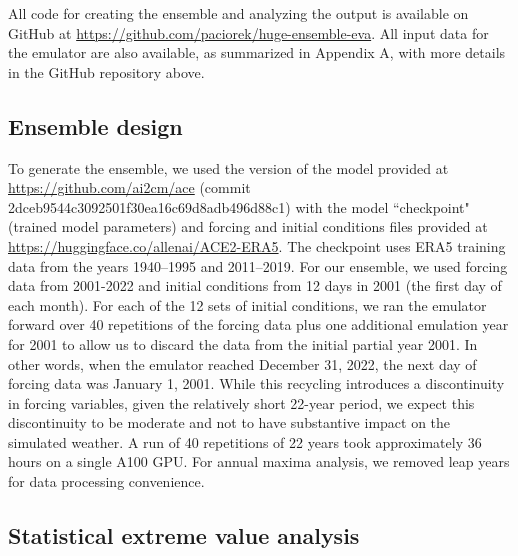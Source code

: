 \documentclass{ametsocV6.1}
\begin{document}
\datastatement
All code for creating the ensemble and analyzing the output is available on GitHub at \url{https://github.com/paciorek/huge-ensemble-eva}.
All input data for the emulator are also available, as summarized in Appendix A, with more details in the GitHub repository above.




\clearpage
\appendix[A] 
\label{app-methods}

\subsection*{Ensemble design}
\label{app:design}


To generate the ensemble, we used the version of the model provided at \url{https://github.com/ai2cm/ace} (commit 2dceb9544c3092501f30ea16c69d8adb496d88c1) with the model ``checkpoint" (trained model parameters) and forcing and initial conditions files provided at \url{https://huggingface.co/allenai/ACE2-ERA5}. The checkpoint uses ERA5 training data from the years 1940–1995 and 2011–2019. For our ensemble, we used forcing data from 2001-2022 and initial conditions from 12 days in 2001 (the first day of each month). For each of the 12 sets of initial conditions, we ran the emulator forward over 40 repetitions of the forcing data plus one additional emulation year for 2001 to allow us to discard the data from the initial partial year 2001. In other words, when the emulator reached December 31, 2022, the next day of forcing data was January 1, 2001. While this recycling introduces a discontinuity in forcing variables, given the relatively short 22-year period, we expect this discontinuity to be moderate and not to have substantive impact on the simulated weather. A run of 40 repetitions of 22 years took approximately 36 hours on a single A100 GPU.  For annual maxima analysis, we removed leap years for data processing convenience.

\subsection*{Statistical extreme value analysis}
\label{app:eva}
\end{document}
